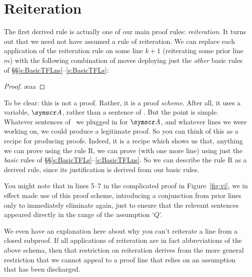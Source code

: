 \section{Reiteration}\label{der.reit}
The first derived rule is actually one of our main proof rules: \emph{reiteration}. It turns out that we need not have assumed a rule of reiteration. We can replace each application of the reiteration rule on some line $k+1$ (reiterating some prior line $m$) with the following combination of moves deploying just the \emph{other} basic rules of §§\ref{s:BasicTFLns}–\ref{s:BasicTFLs}:
\begin{proof}
	\ae{aa}
\end{proof}
To be clear: this is not a proof. Rather, it is a proof \emph{scheme}. After all, it uses a variable, $\meta{A}$, rather than a sentence of \TFL. But the point is simple. Whatever sentences of \TFL\ we plugged in for $\meta{A}$, and whatever lines we were working on, we could produce a legitimate proof. So you can think of this as a recipe for producing proofs. Indeed, it is a recipe which shows us that, anything we can prove using the rule R, we can prove (with one more line) using just the \emph{basic} rules of §§\ref{s:BasicTFLs}–\ref{s:BasicTFLns}. So we can describe the rule R as a derived rule, since its justification is derived from our basic rules.

You might note that in lines 5–7 in the complicated proof in Figure~\ref{fig:vi}, we in effect made use of this proof scheme, introducing a conjunction from prior lines only to immediately eliminate again, just to ensure that the relevant sentences appeared directly in the range of the assumption `$Q$'.

We even have an explanation here about why you can't reiterate a line from a closed subproof. If all applications of reiteration are in fact abbreviations of the above schema, then that restriction on reiteration derives from the more general restriction that we cannot appeal to a proof line that relies on an assumption that has been discharged.


